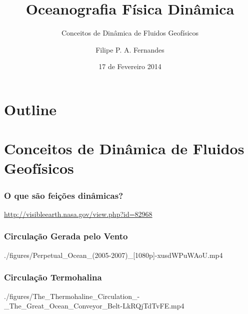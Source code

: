 \title[Aula 01]{Oceanografia Física Dinâmica}
\subtitle{Conceitos de Dinâmica de Fluidos Geofísicos}
\author[Filipe Fernandes]{Filipe P. A. Fernandes}
\date[Fevereiro 2014]{17 de Fevereiro 2014}




\begin{frame}[plain]
  \titlepage
\end{frame}

\section*{Outline}
\begin{frame}
\tableofcontents
\end{frame}

\section{Conceitos de Dinâmica de Fluidos Geofísicos}
\begin{frame}
  \frametitle{O que são feições dinâmicas?}
  \begin{center}
  \end{center}
  \tiny\hfill \url{http://visibleearth.nasa.gov/view.php?id=82968}
\end{frame}


\begin{frame}
  \frametitle{Circulação Gerada pelo Vento}
  \begin{center}
  \movie[showcontrols=true]{\shadowbox{\phantom{\rule{8cm}{5cm}}}}
  {./figures/Perpetual_Ocean_(2005-2007)_[1080p]-xusdWPuWAoU.mp4}
  \end{center}
\end{frame}


\begin{frame}
  \frametitle{Circulação Termohalina}
  \begin{center}
  \movie[showcontrols=true]{\shadowbox{\phantom{\rule{8cm}{5cm}}}}
  {./figures/The_Thermohaline_Circulation_-_The_Great_Ocean_Conveyor_Belt-LkRQjTdTvFE.mp4}
  \end{center}
\end{frame}

